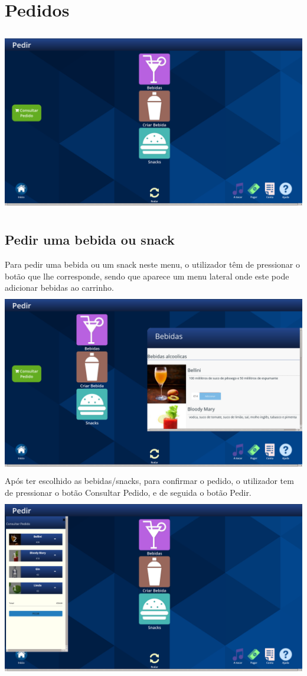 \documentclass{article}
\begin{document}
\section{Pedidos}
\includegraphics[width=15cm, height=8cm]{user_manual_images/order_menu.png}
\subsection{Pedir uma bebida ou snack}
Para pedir uma bebida ou um snack neste menu, o utilizador têm de pressionar o botão que lhe corresponde, sendo que aparece um menu lateral onde este pode adicionar bebidas ao carrinho.\\
\includegraphics[width=15cm, height=8cm]{user_manual_images/drinks_submenu.png} Após ter escolhido as bebidas/snacks, para confirmar o pedido, o utilizador tem de pressionar o botão Consultar Pedido, e de seguida o botão Pedir.\\
\includegraphics[width=15cm, height=8cm]{user_manual_images/ask_order_submenu.png}
\end{document}
